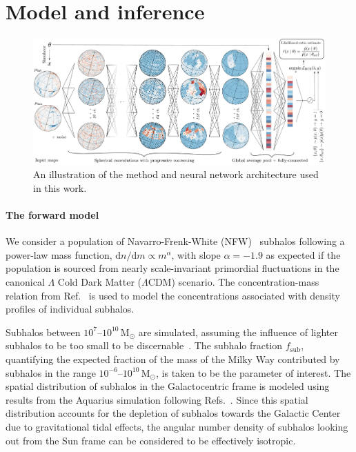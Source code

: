 \documentclass[preprint]{article}
\begin{document}
\section{Model and inference}
\label{sec:model}

\begin{figure}[!htbp]
\centering
\includegraphics[width=1.00\textwidth]{figures/drawing.pdf}
\caption{An illustration of the method and neural network architecture used in this work.}
\label{fig:model}
\end{figure}

\paragraph{The forward model} We consider a population of Navarro-Frenk-White (NFW)~\cite{Navarro:1995iw} subhalos following a power-law mass function, $\mathrm dn / \mathrm dm \propto m^\alpha$, with slope $\alpha = -1.9$ as expected if the population is sourced from nearly scale-invariant primordial fluctuations in the canonical $\Lambda$ Cold Dark Matter ($\Lambda$CDM) scenario. The concentration-mass relation from Ref.~\cite{Sanchez-Conde:2013yxa} is used to model the concentrations associated with density profiles of individual subhalos. 

Subhalos between $10^7$--$10^{10}\,\mathrm{M}_\odot$ are simulated, assuming the influence of lighter subhalos to be too small to be discernable~\cite{Mishra-Sharma:2020ynk}. The subhalo fraction $f_\mathrm{sub}$, quantifying the expected fraction of the mass of the Milky Way contributed by subhalos in the range $10^{-6}$--$10^{10}\,\mathrm{M}_\odot$, is taken to be the parameter of interest. The spatial distribution of subhalos in the Galactocentric frame is modeled using results from the Aquarius simulation following Refs.~\cite{Hutten:2016jko,Springel:2008cc}. Since this spatial distribution accounts for the depletion of subhalos towards the Galactic Center due to gravitational tidal effects, the angular number density of subhalos looking out from the Sun frame can be considered to be effectively isotropic.
\end{document}
